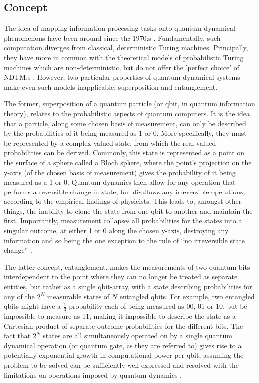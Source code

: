\documentclass[msc,lith,english]{liuthesis}
\begin{document}
\subsection{Concept}
The idea of mapping information processing tasks onto quantum dynamical phenomenons have been around since the 1970:s \cite{QCQI}. Fundamentally, such computation diverges from classical, deterministic Turing machines. Principally, they have more in common with the theoretical models of probabilistic Turing machines which are non-deterministic, but do not offer the 'perfect choice' of NDTM:s \cite{CCAMA}. However, two particular properties of quantum dynamical systems make even such models inapplicable: superposition and entanglement. 

The former, superposition of a quantum particle (or qbit, in quantum information theory), relates to the probabilistic aspects of quantum computers. It is the idea that a particle, along some chosen basis of measurement, can only be described by the probabilities of it being measured as 1 or 0. More specifically, they must be represented by a complex-valued state, from which the real-valued probabilities can be derived. Commonly, this state is represented as a point on the surface of a sphere called a Bloch sphere, where the point's projection on the y-axis (of the chosen basis of measurement) gives the probability of it being measured as a 1 or 0. Quantum dynamics then allow for any operation that performs a reversible change in state, but disallows any irreversible operations, according to the empirical findings of physicists. This leads to, amongst other things, the inability to clone the state from one qbit to another and maintain the first. Importantly, measurement collapses all probabilities for the states into a singular outcome, at either 1 or 0 along the chosen y-axis, destroying any information and so being the one exception to the rule of ``no irreversible state change'' \cite{QCQI}.

The latter concept, entanglement, makes the measurements of two quantum bits interdependent to the point where they can no longer be treated as separate entities, but rather as a single qbit-array, with a state describing probabilities for any of the $2^N$ measurable states of $N$ entangled qbits. For example, two entangled qbits might have a $\frac{1}{3}$ probability each of being measured as 00, 01 or 10, but be impossible to measure as 11, making it impossible to describe the state as a Cartesian product of separate outcome probabilities for the different bits. The fact that $2^N$ states are all simultaneously operated on by a single quantum dynamical operation (or quantum gate, as they are referred to) gives rise to a potentially exponential growth in computational power per qbit, assuming the problem to be solved can be sufficiently well expressed and resolved with the limitations on operations imposed by quantum dynamics \cite{QCQI}\cite{EIQC}. 
\end{document}
